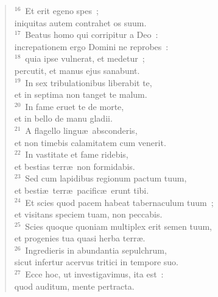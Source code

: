 \begin{flushleft}
\begin{verse}
${}^{16}$~Et erit egeno spes~;\\ iniquitas autem contrahet os suum.\\
${}^{17}$~Beatus homo qui corripitur a Deo~:\\ increpationem ergo Domini ne reprobes~:\\
${}^{18}$~quia ipse vulnerat, et medetur~;\\ percutit, et manus ejus sanabunt.\\
${}^{19}$~In sex tribulationibus liberabit te,\\ et in septima non tanget te malum.\\
${}^{20}$~In fame eruet te de morte,\\ et in bello de manu gladii.\\
${}^{21}$~A flagello lingu\ae\ absconderis,\\ et non timebis calamitatem cum venerit.\\
${}^{22}$~In vastitate et fame ridebis,\\ et bestias terr\ae\ non formidabis.\\
${}^{23}$~Sed cum lapidibus regionum pactum tuum,\\ et besti\ae\ terr\ae\ pacific\ae\ erunt tibi.\\
${}^{24}$~Et scies quod pacem habeat tabernaculum tuum~;\\ et visitans speciem tuam, non peccabis.\\
${}^{25}$~Scies quoque quoniam multiplex erit semen tuum,\\ et progenies tua quasi herba terr\ae .\\
${}^{26}$~Ingredieris in abundantia sepulchrum,\\ sicut infertur acervus tritici in tempore suo.\\
${}^{27}$~Ecce hoc, ut investigavimus, ita est~:\\ quod auditum, mente pertracta.\end{verse}\end{flushleft}


